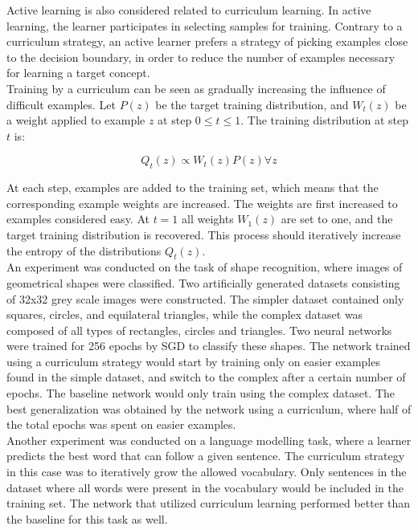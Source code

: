 Active learning \citep{Cohn_active_learning} is also considered related to curriculum learning. In active learning, the learner participates in selecting samples for training. Contrary to a curriculum strategy, an active learner prefers a strategy of picking examples close to the decision boundary, in order to reduce the number of examples necessary for learning a target concept.\\

Training by a curriculum can be seen as gradually increasing the influence of difficult examples. Let $P(z)$ be the target training distribution, and $W_{t}(z)$ be a weight applied to example $z$ at step $0\leq t\leq 1$. The training distribution at step $t$ is:

$$Q_{t}(z)\propto W_{t}(z)P(z)\forall z$$

At each step, examples are added to the training set, which means that the corresponding example weights are increased. The weights are first increased to examples considered easy.  
At $t=1$ all weights $W_{1}(z)$ are set to one, and the target training distribution is recovered. This process should iteratively increase the entropy of the distributions $Q_{t}(z)$. \\


An experiment was conducted on the task of shape recognition, where images of geometrical shapes were classified. Two artificially generated datasets consisting of 32x32 grey scale images were constructed. The simpler dataset contained only squares, circles, and equilateral triangles, while the complex dataset was composed of all types of rectangles, circles and triangles. Two neural networks were trained for 256 epochs by \ac{SGD} to classify these shapes. The network trained using a curriculum strategy would start by training only on easier examples found in the simple dataset, and switch to the complex after a certain number of epochs. The baseline network would only train using the complex dataset. The best generalization was obtained by the network using a curriculum, where half of the total epochs was spent on easier examples. \\

Another experiment was conducted on a language modelling task, where a learner predicts the best word that can follow a given sentence. The curriculum strategy in this case was to iteratively grow the allowed vocabulary. Only sentences in the dataset where all words were present in the vocabulary would be included in the training set. The network that utilized curriculum learning performed better than the baseline for this task as well.\\

